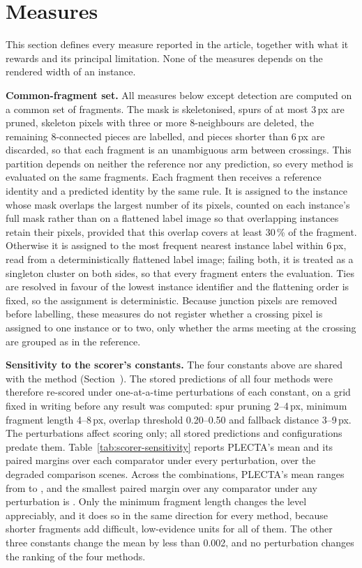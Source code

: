 \section{Measures}
\label{app:measures}

This section defines every measure reported in the article, together with
what it rewards and its principal limitation. None of the measures depends on
the rendered width of an instance.

\textbf{Common-fragment set.} All measures below except detection \Fone{} are
computed on a common set of fragments. The mask is skeletonised, spurs of at
most 3\,px are pruned, skeleton pixels with three or more 8-neighbours are
deleted, the remaining 8-connected pieces are labelled, and pieces shorter than
6\,px are discarded, so that each fragment is an unambiguous arm between
crossings. This partition depends on neither the reference nor any prediction,
so every method is evaluated on the same fragments. Each fragment then
receives a reference identity and a predicted identity by the same rule. It is
assigned to the instance whose mask overlaps the largest number of its pixels,
counted on each instance's full mask rather than on a flattened label image so
that overlapping instances retain their pixels, provided that this overlap
covers at least 30\,\% of the fragment. Otherwise it is assigned to the most
frequent nearest instance label within 6\,px, read from a deterministically
flattened label image; failing both, it is treated as a singleton cluster on
both sides, so that every fragment enters the evaluation. Ties are resolved in
favour of the lowest instance identifier and the flattening order is fixed, so
the assignment is deterministic. Because junction pixels are removed before
labelling, these measures do not register whether a crossing pixel is assigned
to one instance or to two, only whether the arms meeting at the crossing are
grouped as in the reference.

\textbf{Sensitivity to the scorer's constants.} The four constants above are
shared with the method (Section~). The stored
predictions of all four methods were therefore re-scored under one-at-a-time
perturbations of each constant, on a grid fixed in writing before any result
was computed: spur pruning 2--4\,px, minimum fragment length 4--8\,px, overlap
threshold 0.20--0.50 and fallback distance 3--9\,px. The perturbations affect
scoring only; all stored predictions and configurations predate them.
Table~\ref{tab:scorer-sensitivity} reports PLECTA's mean \Fone{} and its paired
margins over each comparator under every perturbation, over the
\PlectaGreedySceneCount{} degraded comparison scenes. Across the
\PlectaScorerSensitivityComboCount{} combinations, PLECTA's mean \Fone{} ranges
from \PlectaScorerSensitivityFOneLow{} to \PlectaScorerSensitivityFOneHigh{},
and the smallest paired margin over any comparator under any perturbation is
\PlectaScorerSensitivityMarginMin{}. Only the minimum fragment length changes
the level appreciably, and it does so in the same direction for every method,
because shorter fragments add difficult, low-evidence units for all of them.
The other three constants change the mean by less than 0.002, and no
perturbation changes the ranking of the four methods.

